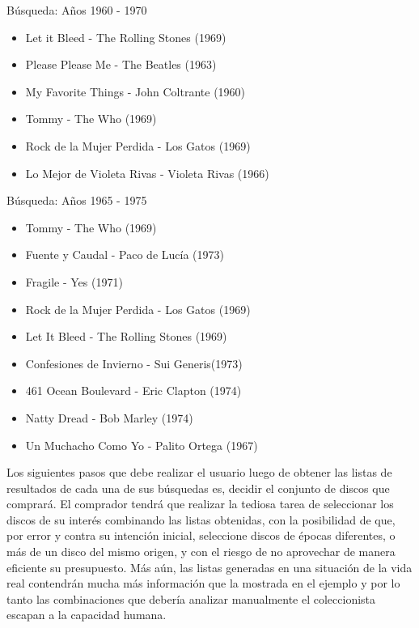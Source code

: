 \begin{mybox}{Búsqueda: Años 1960 - 1970}
\begin{itemize}
	\item {\scriptsize Let it Bleed - The Rolling Stones (1969)}
	\item {\scriptsize Please Please Me - The Beatles (1963)}
	\item {\scriptsize My Favorite Things - John Coltrante (1960)}
	\item {\scriptsize Tommy - The Who (1969)}
	\item {\scriptsize Rock de la Mujer Perdida - Los Gatos (1969)}
	\item {\scriptsize Lo Mejor de Violeta Rivas - Violeta Rivas (1966)}
\end{itemize}
\end{mybox}

\begin{mybox}{Búsqueda: Años 1965 - 1975}
\begin{itemize}
	\item {\scriptsize Tommy - The Who (1969)}
	\item {\scriptsize Fuente y Caudal - Paco de Lucía (1973)}
	\item {\scriptsize Fragile - Yes (1971)}
	\item {\scriptsize Rock de la Mujer Perdida - Los Gatos (1969)}
	\item {\scriptsize Let It Bleed - The Rolling Stones (1969)}
	\item {\scriptsize Confesiones de Invierno - Sui Generis(1973)}
	\item {\scriptsize 461 Ocean Boulevard - Eric Clapton (1974)}
	\item {\scriptsize Natty Dread - Bob Marley (1974)}
	\item {\scriptsize Un Muchacho Como Yo - Palito Ortega (1967)}
\end{itemize}
\end{mybox}

Los siguientes pasos que debe realizar el usuario luego de obtener las listas de resultados de cada una de sus búsquedas es, decidir el conjunto de discos que comprará. El comprador tendrá que realizar la tediosa tarea de seleccionar los discos de su interés combinando las listas obtenidas, con la posibilidad de que, por error y contra su intención inicial, seleccione discos de épocas diferentes, o más de un disco del mismo origen, y con el riesgo de no aprovechar de manera eficiente su presupuesto. Más aún, las listas generadas en una situación de la vida real contendrán mucha más información que la mostrada en el ejemplo y por lo tanto las combinaciones que debería analizar manualmente el coleccionista escapan a la capacidad humana. 

